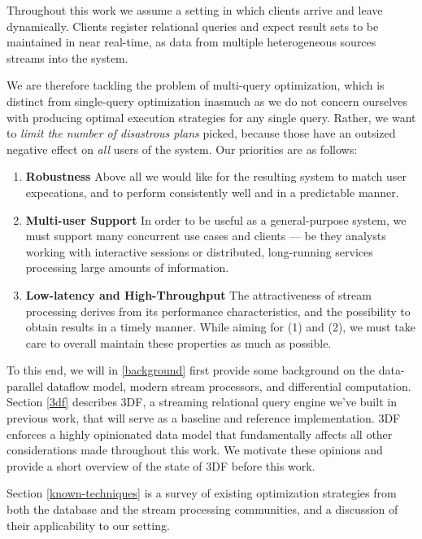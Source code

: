\documentclass[../index.tex]{subfiles}
\begin{document}
Throughout this work we assume a setting in which clients arrive and
leave dynamically. Clients register relational queries and expect
result sets to be maintained in near real-time, as data from multiple
heterogeneous sources streams into the system.

We are therefore tackling the problem of multi-query optimization,
which is distinct from single-query optimization inasmuch as we do not
concern ourselves with producing optimal execution strategies for any
single query. Rather, we want to \emph{limit the number of disastrous
  plans} picked, because those have an outsized negative effect on
\emph{all} users of the system. Our priorities are as follows:

\begin{enumerate}
  \item \textbf{Robustness} Above all we would like for the resulting
    system to match user expecations, and to perform consistently well
    and in a predictable manner.

  \item \textbf{Multi-user Support} In order to be useful as a
    general-purpose system, we must support many concurrent use cases
    and clients — be they analysts working with interactive sessions
    or distributed, long-running services processing large amounts of
    information.

  \item \textbf{Low-latency and High-Throughput} The attractiveness of
    stream processing derives from its performance characteristics,
    and the possibility to obtain results in a timely manner. While
    aiming for (1) and (2), we must take care to overall maintain
    these properties as much as possible.
\end{enumerate}

To this end, we will in \autoref{background} first provide some
background on the data-parallel dataflow model, modern stream
processors, and differential computation. Section \ref{3df} describes
3DF, a streaming relational query engine we've built in previous work,
that will serve as a baseline and reference implementation. 3DF
enforces a highly opinionated data model that fundamentally affects
all other considerations made throughout this work. We motivate these
opinions and provide a short overview of the state of 3DF before this
work.

Section \ref{known-techniques} is a survey of existing optimization
strategies from both the database and the stream processing
communities, and a discussion of their applicability to our setting.
\end{document}
